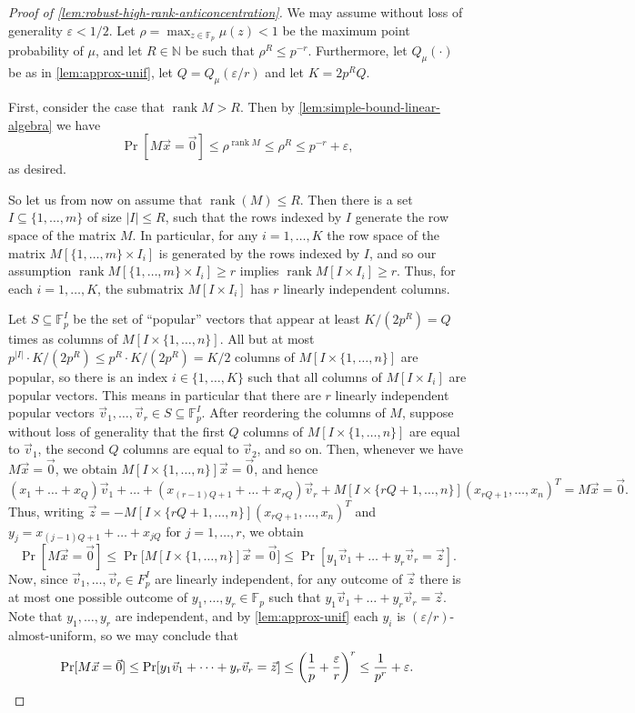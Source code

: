 \documentclass[10pt,reqno]{amsart}
\let\originalleft\left
\let\originalright\right
\renewcommand{\left}{\mathopen{}\mathclose\bgroup\originalleft}
\renewcommand{\right}{\aftergroup\egroup\originalright}
\numberwithin{equation}{section}
\theoremstyle{remark}
\newcommand{\mb}{\mathbb}
\newcommand{\on}{\operatorname}
\newcommand{\eps}{\varepsilon}
\begin{document}
\begin{proof}[Proof of \cref{lem:robust-high-rank-anticoncentration}]
We may assume without loss of generality $\eps<1/2$. Let $\rho=\max_{z\in\mb F_{p}}\mu(z)<1$ be the maximum point probability of $\mu$, and let $R\in \mb N$ be such that $\rho^R\le p^{-r}$. Furthermore, let $Q_\mu(\cdot)$ be as in \cref{lem:approx-unif}, let $Q=Q_\mu(\varepsilon/r)$ and let $K=2p^{R}Q$.

First, consider the case that $\on{rank} M> R$. Then by \cref{lem:simple-bound-linear-algebra} we have
\[\Pr[M\vec{x}=\vec{0}]\le\rho^{\on{rank} M}\le \rho^R\le p^{-r}+\eps,\]
as desired.

So let us from now on assume that $\on{rank}(M)\le R$. Then there is a set $I\subseteq\{1,\dots,m\}$ of size $|I|\le R$, such that the rows indexed by $I$ generate the row space of the matrix $M$. In particular, for any $i=1,\dots,K$ the row space of the matrix $M[\{1,\dots,m\}\times I_i]$ is generated by the rows indexed by $I$, and so our assumption $\on{rank} M[\{1,\dots,m\}\times I_i]\ge r$ implies $\on{rank} M[I\times I_i]\ge r$. Thus, for each $i=1,\dots,K$, the submatrix $M[I\times I_i]$ has $r$ linearly independent columns.

Let $S\subseteq\mb F_{p}^{I}$ be the set of ``popular'' vectors that appear at least $K/(2p^{R})=Q$ times as columns of $M[I\times \{1,\dots,n\}]$. All but at most $p^{|I|}\cdot K/(2p^{R})\le p^{R}\cdot K/(2p^{R})=K/2$ columns of $M[I\times \{1,\dots,n\}]$ are popular, so there is an index $i\in\{1,\dots,K\}$ such that all columns of $M[I\times I_i]$ are popular vectors. This means in particular that there are $r$ linearly independent popular vectors $\vec{v}_{1},\dots,\vec{v}_{r}\in S\subseteq \mb F_{p}^{I}$. After reordering the columns of $M$, suppose without loss of generality that the first
$Q$ columns of $M[I\times \{1,\dots,n\}]$ are equal to $\vec{v}_{1}$, the second $Q$ columns are equal to $\vec{v}_{2}$, and so on. Then, whenever we have $M\vec{x}=\vec{0}$, we obtain $M[I\times \{1,\dots,n\}]\vec{x}=\vec{0}$, and hence
\[(x_1+\dots+x_Q)\vec{v}_{1}+\dots+(x_{(r-1)Q+1}+\dots+x_{rQ})\vec{v}_{r}+M[I\times\{rQ+1,\dots,n\}](x_{rQ+1},\dots,x_{n})^{T}=M\vec{x}=\vec{0}.\]
Thus, writing $\vec{z}=-M[I\times\{rQ+1,\dots,n\}](x_{rQ+1},\dots,x_{n})^{T}$ and $y_{j}=x_{(j-1)Q+1}+\dots+x_{jQ}$ for $j=1,\dots,r$, we obtain
\[
\Pr[M\vec{x}=\vec{0}]\le\Pr\!\big[M[I\times \{1,\dots,n\}]\vec{x}=\vec{0}\big]\le \Pr[y_{1}\vec{v}_{1}+\dots+y_{r}\vec{v}_{r}=\vec{z}].
\]
Now, since $\vec{v}_{1},\dots,\vec{v}_{r}\in F_{p}^{I}$ are linearly independent, for any outcome of $\vec{z}$ there is at most  one possible outcome of $y_{1},\dots,y_{r}\in\mb F_{p}$ such that $y_{1}\vec v_{1}+\dots+y_{r}\vec v_{r}=\vec{z}$.
Note that $y_{1},\dots,y_r$ are independent, and by \cref{lem:approx-unif} each $y_i$ is $(\varepsilon/r)$-almost-uniform, so we may conclude that
\[
\Pr[M\vec{x}=\vec{0}]\le\Pr[y_{1}\vec{v}_{1}+\dots+y_{r}\vec{v}_{r}=\vec{z}]\le \left(\frac{1}{p}+\frac{\varepsilon}{r}\right)^{r}\le\frac{1}{p^r}+\varepsilon.\qedhere
\]
\end{proof}
\end{document}
